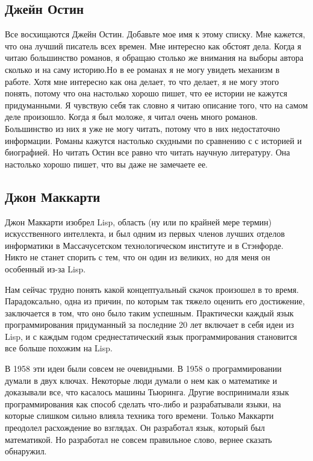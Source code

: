 \documentclass[ebook,12pt,oneside,openany]{memoir}
\begin{document}
\subsection{Джейн Остин}

Все восхищаются Джейн Остин. Добавьте мое имя к этому списку. Мне
кажется, что она лучший писатель всех времен. Мне интересно как
обстоят дела. Когда я читаю большинство романов, я обращаю столько же
внимания на выборы автора сколько и на саму историю.Но в ее романах я
не могу увидеть механизм в работе. Хотя мне интересно как она делает,
то что делает, я не могу этого понять, потому что она настолько хорошо
пишет, что ее истории не кажутся придуманными. Я чувствую себя так
словно я читаю описание того, что на самом деле произошло. Когда я был
моложе, я читал очень много романов. Большинство из них я уже не могу
читать, потому что в них недостаточно информации. Романы кажутся
настолько скудными по сравнению с с историей и биографией. Но читать
Остин все равно что читать научную литературу. Она настолько хорошо
пишет, что вы даже не замечаете ее. \newline

\subsection{Джон Маккарти}

Джон Маккарти изобрел Lisp, область (ну или по крайней мере термин)
искусственного интеллекта, и был одним из первых членов лучших отделов
информатики в Массачусетском технологическом институте и в Стэнфорде.
Никто не станет спорить с тем, что он один из великих, но для меня он
особенный из-за Lisp. \newline

Нам сейчас трудно понять какой концептуальный скачок произошел в то
время. Парадоксально, одна из причин, по которым так тяжело оценить
его достижение, заключается в том, что оно было таким успешным.
Практически каждый язык программирования придуманный за последние 20
лет включает в себя идеи из Lisp, и с каждым годом среднестатический
язык программирования становится все больше похожим на Lisp. \newline

В 1958 эти идеи были совсем не очевидными. В 1958 о программировании
думали в двух ключах. Некоторые люди думали о нем как о математике и
доказывали все, что касалось машины Тьюринга. Другие воспринимали язык
программирования как способ сделать что-либо и разрабатывали языки, на
которые слишком сильно влияла техника того времени. Только Маккарти
преодолел расхождение во взглядах. Он разработал язык, который был
математикой. Но разработал не совсем правильное слово, вернее сказать
обнаружил. \newline
\end{document}
